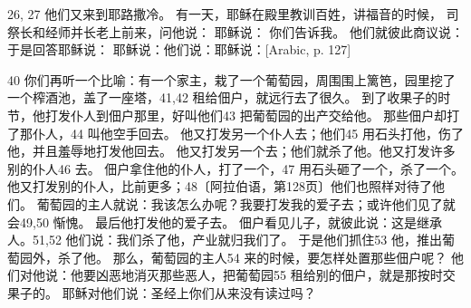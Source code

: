 26, 27  他们又来到耶路撒冷。 有一天，耶稣在殿里教训百姓，讲福音的时候， 司祭长和经师并长老上前来，问他说： 耶稣说： 你们告诉我。 他们就彼此商议说： 于是回答耶稣说： 耶稣说：他们说：耶稣说：[Arabic, p. 127]\par

40  你们再听一个比喻：有一个家主，栽了一个葡萄园，周围围上篱笆，园里挖了一个榨酒池，盖了一座塔，41,42 租给佃户，就远行去了很久。 到了收果子的时节，他打发仆人到佃户那里，好叫他们43 把葡萄园的出产交给他。 那些佃户却打了那仆人，44 叫他空手回去。 他又打发另一个仆人去；他们45 用石头打他，伤了他，并且羞辱地打发他回去。 他又打发另一个去；他们就杀了他。他又打发许多别的仆人46 去。 佃户拿住他的仆人，打了一个，47 用石头砸了一个，杀了一个。 他又打发别的仆人，比前更多；48〔阿拉伯语，第128页〕他们也照样对待了他们。 葡萄园的主人就说：我该怎么办呢？我要打发我的爱子去；或许他们见了就会49,50 惭愧。 最后他打发他的爱子去。 佃户看见儿子，就彼此说：这是继承人。51,52  他们说：我们杀了他，产业就归我们了。 于是他们抓住53 他，推出葡萄园外，杀了他。 那么，葡萄园的主人54 来的时候，要怎样处置那些佃户呢？ 他们对他说：他要凶恶地消灭那些恶人，把葡萄园55 租给别的佃户，就是那按时交果子的。 耶稣对他们说：圣经上你们从来没有读过吗？\par

